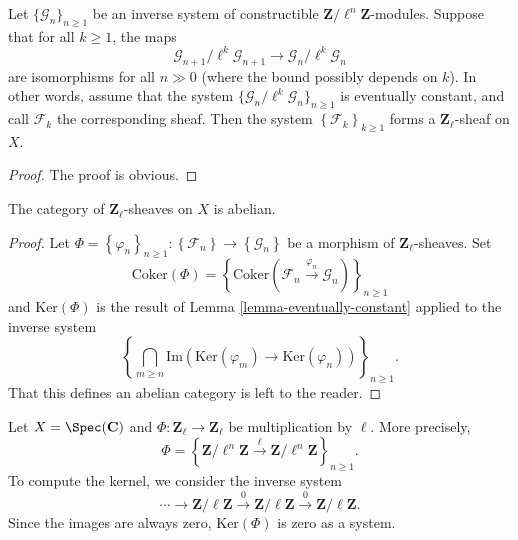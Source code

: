 \begin{lemma}
\label{lemma-eventually-constant}
Let $\{\mathcal{G}_n\}_{n\geq 1}$ be an inverse system of constructible
$\mathbf{Z}/\ell^n\mathbf{Z}$-modules.
Suppose that for all $k\geq 1$, the maps
$$
\mathcal{G}_{n+1}/\ell^k \mathcal{G}_{n+1}\to \mathcal{G}_n /\ell^k
\mathcal{G}_n
$$
are isomorphisms for all $n\gg 0$ (where the bound possibly depends on $k$).
In other words, assume that the system
$\{\mathcal{G}_n/\ell^k\mathcal{G}_n\}_{n\geq 1}$
is eventually constant, and call $\mathcal{F}_k$ the corresponding sheaf.
Then the system $\left\{\mathcal{F}_k\right\}_{k\geq 1}$ forms a
$\mathbf{Z}_\ell$-sheaf on $X$.
\end{lemma}

\begin{proof}
The proof is obvious.
\end{proof}

\begin{lemma}
\label{lemma-l-adic-abelian}
The category of $\mathbf{Z}_\ell$-sheaves on $X$ is abelian.
\end{lemma}

\begin{proof}
Let $\Phi=\left\{\varphi_n\right\}_{n\geq 1}: \left\{\mathcal{F}_n\right\}\to
\left\{\mathcal{G}_n\right\}$ be a morphism of $\mathbf{Z}_\ell$-sheaves. Set
$$
\text{Coker}(\Phi) =
\left\{
\text{Coker}\left(\mathcal{F}_n \xrightarrow{\varphi_n} \mathcal{G}_n\right)
\right\}_{n\geq 1}
$$
and $\text{Ker}(\Phi)$ is the result of
Lemma \ref{lemma-eventually-constant}
applied to the inverse system
$$
\left\{
\bigcap_{m\geq n}
\text{Im}\left(\text{Ker}(\varphi_m) \to \text{Ker}(\varphi_n)\right)
\right\}_{n \geq 1}.
$$
That this defines an abelian category is left to the reader.
\end{proof}

\begin{example}
\label{example-kernel}
Let $X=\Spec(\mathbf{C})$ and $\Phi : \mathbf{Z}_\ell\to \mathbf{Z}_\ell$
be multiplication by $\ell$. More precisely,
$$
\Phi = \left\{ \mathbf{Z}/\ell^n\mathbf{Z} \xrightarrow{\ell}
\mathbf{Z}/\ell^n\mathbf{Z}\right\}_{n \geq 1}.
$$
To compute the kernel, we consider the inverse system
$$
\cdots\to \mathbf{Z}/\ell\mathbf{Z}\xrightarrow{0}
\mathbf{Z}/\ell\mathbf{Z}\xrightarrow{0}\mathbf{Z}/\ell\mathbf{Z}.
$$
Since the images are always zero, $\text{Ker}(\Phi)$ is zero as a system.
\end{example}

